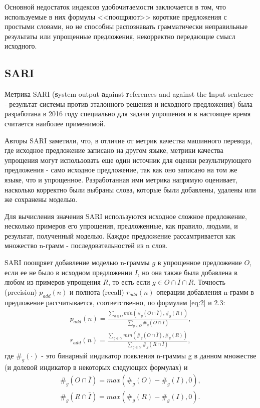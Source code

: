 Основной недостаток индексов удобочитаемости заключается в том, что используемые в них формулы <<поощряют>> короткие предложения с простыми словами, но не способны распознавать грамматически неправильные результаты или упрощенные предложения, некорректно передающие смысл исходного.

\subsection{SARI}

Метрика SARI (\textbf{s}ystem output \textbf{a}gainst \textbf{r}eferences and against the \textbf{i}nput sentence - результат системы против эталонного решения и исходного предложения) была разработана в 2016 году специально для задачи упрошения и в настоящее время считается наиболее применимой\cite{xu_optimizing_2016}.

Авторы SARI заметили, что, в отличие от метрик качества машинного перевода, где исходное предложение записано на другом языке, метрики качества упрощения могут использовать еще один источник для оценки результирующего предложения - само исходное предложение, так как оно записано на том же языке, что и упрощенное. Разработанная ими метрика напрямую оценивает, насколько корректно были выбраны слова, которые были добавлены, удалены или же сохранены моделью.

Для вычисления значения SARI используются исходное сложное предложение, несколько примеров его упрощения, предложенные, как правило, людьми, и результат, полученный моделью. Каждое предложение рассамтривается как множество n-грамм - последовательностей из n слов.

SARI поощряет добавление моделью n-граммы $g$ в упрощенное предложение $O$, если ее не было в исходном предложении $I$, но она также была добавлена в любом из примеров упрощения $R$, то есть если $g \in{O\cap\bar{I}\cap{R}}$. Точность (precision) $p_{add}(n)$ и полнота (recall) $r_{add}(n)$ операции добавления n-грамм в предложение  рассчитывается, соответственно, по формулам \ref{eq:2} и 2.3: 
\begin{eqnarray} 
	\label{eq:2}
	p_{add}(n) = \frac{\sum\limits_{g\in{O}}^{} min\left( \#_{g}\left(O\cap{\bar{I}}\right), \#_{g}\left(R\right)\right)}{\sum\limits_{g\in{O}}^{} \#_{g}\left(O\cap{\bar{I}}\right)} ,\\
	r_{add}(n) = \frac{\sum\limits_{g\in{O}}^{} min\left( \#_{g}\left(O\cap{\bar{I}}\right), \#_{g}\left(R\right)\right)}{\sum\limits_{g\in{O}}^{} \#_{g}\left(R\cap{\bar{I}}\right)} ,
\end{eqnarray}
где $\#_{g}\left(\cdot\right)$ - это бинарный индикатор появления n-граммы g в данном множестве (и долевой индикатор в некоторых следующих формулах) и 
\begin{eqnarray} 
	\label{eq:4}
	\#_{g}\left(O\cap{\bar{I}}\right) = max\left(\#_{g}\left(O\right) - \#_{g}\left(I\right), 0\right) ,\\
	\#_{g}\left(R\cap{\bar{I}}\right) = max\left(\#_{g}\left(R\right) - \#_{g}\left(I\right), 0\right) .
\end{eqnarray}

